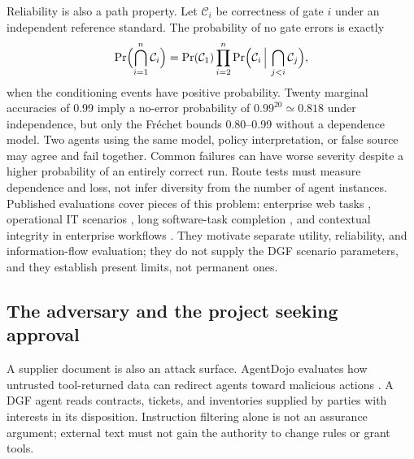 Reliability is also a path property. Let $\mathcal{C}_i$ be correctness of gate $i$ under an
independent reference standard. The probability of no gate errors is exactly
\begin{equation}
\Pr\Bigl(\bigcap_{i=1}^{n}\mathcal{C}_i\Bigr)=\Pr(\mathcal{C}_1)\prod_{i=2}^{n}
\Pr\Bigl(\mathcal{C}_i \,\Big|\, \bigcap_{j<i}\mathcal{C}_j\Bigr), \label{eq:chain}
\end{equation}
when the conditioning events have positive probability. Twenty marginal accuracies of 0.99 imply a
no-error probability of $0.99^{20}\simeq 0.818$ under independence, but only the Fr\'echet bounds
0.80--0.99 without a dependence model. Two agents using the same model, policy interpretation, or false
source may agree and fail together. Common failures can have worse severity despite a higher
probability of an entirely correct run. Route tests must measure dependence and loss, not infer
diversity from the number of agent instances. Published evaluations cover pieces of this problem:
enterprise web tasks \citep{drouin2024}, operational IT scenarios \citep{jha2025}, long software-task
completion \citep{kwa2025}, and contextual integrity in enterprise workflows \citep{fu2026}. They
motivate separate utility, reliability, and information-flow evaluation; they do not supply the DGF
scenario parameters, and they establish present limits, not permanent ones.

\subsection{The adversary and the project seeking approval}
\label{sec:strategic}

A supplier document is also an attack surface. AgentDojo evaluates how untrusted tool-returned data can
redirect agents toward malicious actions \citep{debenedetti2024}. A DGF agent reads contracts, tickets,
and inventories supplied by parties with interests in its disposition. Instruction filtering alone is
not an assurance argument; external text must not gain the authority to change rules or grant tools.

